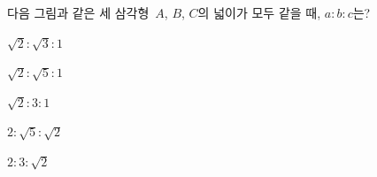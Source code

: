 다음 그림과 같은 세 삼각형~$A$, $B$, $C$의 넓이가 모두 같을 때, $a:b:c$는?
\par\smallskip\begin{center}\resizebox{\ifdim\width>\linewidth\linewidth\else\width\fi}{!}{}\end{center}
\begin{choicesii}{\rule[-3ex]{0pt}{8ex}$\sqrt{2}:\sqrt{3}:1$}{\rule[-3ex]{0pt}{8ex}$\sqrt{2}:\sqrt{5}:1$}{\rule[-3ex]{0pt}{8ex}$\sqrt{2}:3:1$}{\rule[-3ex]{0pt}{8ex}$2:\sqrt{5}:\sqrt{2}$}{\rule[-3ex]{0pt}{8ex}$2:3:\sqrt{2}$}\end{choicesii}
